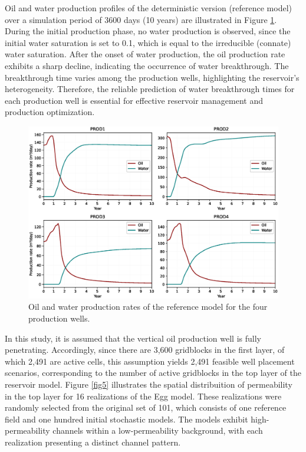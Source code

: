 \documentclass[pdflatex,sn-basic]{sn-jnl}%
\theoremstyle{thmstyleone}%
\theoremstyle{thmstyletwo}%
\theoremstyle{thmstylethree}%
\begin{document}
Oil and water production profiles of the deterministic version (reference model) over a simulation period of 3600 days (10 years) are illustrated in Figure \ref{fig4}. During the initial production phase, no water production is observed, since the initial water saturation is set to 0.1, which is equal to the irreducible (connate) water saturation. After the onset of water production, the oil production rate exhibits a sharp decline, indicating the occurrence of water breakthrough. The breakthrough time varies among the production wells, highlighting the reservoir's heterogeneity. Therefore, the reliable prediction of water breakthrough times for each production well is essential for effective reservoir management and production optimization.

\begin{figure}[H]
\centering
\begin{minipage}{0.95\textwidth}
  \includegraphics[width=\textwidth]{production_plot.eps}
  \caption{Oil and water production rates of the reference model for the four production wells.}
  \label{fig4}
\end{minipage}
\end{figure}

In this study, it is assumed that the vertical oil production well is fully penetrating. Accordingly, since there are 3,600 gridblocks in the first layer, of which 2,491 are active cells, this assumption yields 2,491 feasible well placement scenarios, corresponding to the number of active gridblocks in the top layer of the reservoir model. Figure \ref{fig5} illustrates the spatial distribuition of permeability in the top layer for 16 realizations of the Egg model. These realizations were randomly selected from the original set of 101, which consists of one reference field and one hundred initial stochastic models. The models exhibit high-permeability channels within a low-permeability background, with each realization presenting a distinct channel pattern.
\end{document}
